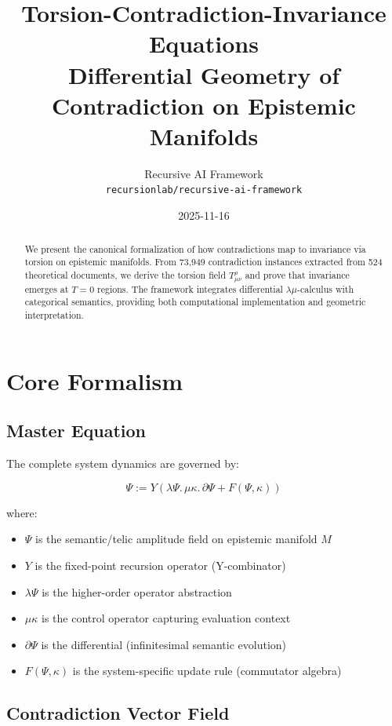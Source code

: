\documentclass{article}
\title{Torsion-Contradiction-Invariance Equations\\
\large{Differential Geometry of Contradiction on Epistemic Manifolds}}
\author{Recursive AI Framework\\
\texttt{recursionlab/recursive-ai-framework}}
\date{2025-11-16}
\begin{document}
\maketitle

\begin{abstract}
We present the canonical formalization of how contradictions map to invariance via torsion on epistemic manifolds. From 73,949 contradiction instances extracted from 524 theoretical documents, we derive the torsion field $T^\rho_{\mu\nu}$ and prove that invariance emerges at $T = 0$ regions. The framework integrates differential $\lambda\mu$-calculus with categorical semantics, providing both computational implementation and geometric interpretation.
\end{abstract}

\section{Core Formalism}

\subsection{Master Equation}

The complete system dynamics are governed by:

\begin{equation}
\boxed{\Psi := Y \left( \lambda \Psi. \, \mu\kappa. \, \partial\Psi + F(\Psi, \kappa) \right)}
\end{equation}

where:
\begin{itemize}
    \item $\Psi$ is the semantic/telic amplitude field on epistemic manifold $M$
    \item $Y$ is the fixed-point recursion operator (Y-combinator)
    \item $\lambda\Psi$ is the higher-order operator abstraction
    \item $\mu\kappa$ is the control operator capturing evaluation context
    \item $\partial\Psi$ is the differential (infinitesimal semantic evolution)
    \item $F(\Psi, \kappa)$ is the system-specific update rule (commutator algebra)
\end{itemize}

\subsection{Contradiction Vector Field}
\end{document}
